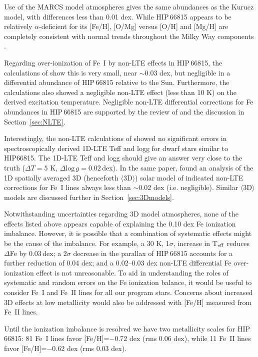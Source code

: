 \documentclass[revtex4]{emulateapj}
\begin{document}
Use of the MARCS model atmospheres \citep{Gust2008} gives the same abundances as the Kurucz model, with differences less than 0.01 dex.  While HIP\,66815 appears to be relatively $\alpha$-deficient for its [Fe/H], [O/Mg] versus [O/H] and [Mg/H] are completely consistent with normal trends throughout the Milky Way components \citep[e.g.,][]{McW2008,Bensby2005,Fulb2007}. 

Regarding over-ionization of Fe~I by non-LTE effects in HIP\,66815, the calculations of \citet{Lind2012} show this is very small, near $\sim$0.03 dex, but negligible in a differential abundance of HIP\,66815 relative to the Sun.  Furthermore, the \citet{Lind2012} calculations also showed a negligible non-LTE effect (less than 10 K) on the derived excitation temperature.  Negligible non-LTE differential corrections for Fe abundances in HIP\,66815 are supported by the review of \citet{Mash2014} and the discussion in Section~\ref{sec:NLTE}.

Interestingly, the non-LTE calculations of \citet{Berg2012} showed no significant errors in spectroscopically derived 1D-LTE Teff and logg for dwarf stars similar to HIP66815.  The 1D-LTE Teff and logg should give an answer very close to the truth ($\Delta T = 5$ K, $\Delta \mathrm{log}\,g = 0.02$\,dex).  In the same paper, \citet{Berg2012} found an analysis of the 1D spatially averaged 3D (henceforth $\langle$3D$\rangle$) solar model of \citet{Coll2011} indicated non-LTE corrections for Fe~I lines always less than $\sim$0.02 dex (i.e. negligible).  Similar $\langle$3D$\rangle$ models are discussed further in Section~\ref{sec:3Dmodels}.

Notwithstanding uncertainties regarding 3D model atmospheres, none of the effects listed above appears capable of explaining the 0.10 dex Fe ionization imbalance. However, it is possible that a combination of systematic effects might be the cause of the imbalance.  For example, a 30 K, 1$\sigma$, increase in T$_{\rm eff}$ reduces $\Delta$Fe by 0.03\,dex; a 2$\sigma$ decrease in the parallax of HIP\,66815 accounts for a further reduction of 0.04 dex; and a 0.02--0.03 dex non-LTE differential Fe over-ionization effect is not unreasonable.  To aid in understanding the roles of systematic and random errors on the Fe ionization balance, it would be useful to consider Fe~I and Fe~II lines for all our program stars.  Concerns about increased 3D effects at low metallicity would also be addressed with [Fe/H] measured from Fe~II lines.

Until the ionization imbalance is resolved we have two metallicity scales for HIP\,66815: 81 Fe~I lines favor [Fe/H]=$-$0.72 dex (rms 0.06 dex), while 11 Fe~II lines favor [Fe/H]=$-$0.62 dex (rms 0.03 dex).
\end{document}
